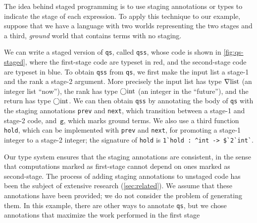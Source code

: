 \begin{abstrsyn}
The idea behind staged programming is to use staging annotations or
types to indicate the stage of each expression.  To apply this
technique to our example, suppose that we have a language with two
worlds representing the two stages and a third, {\em ground} world
that contains terms with no staging.

We can write a staged version of \texttt{qs}, called \texttt{qss},
whose code is shown in \ref{fig:qs-staged}, where the first-stage code
are typeset in red, and the second-stage code are typeset in blue.  To
obtain \texttt{qss} from \texttt{qs}, we first make the input list a
stage-1 and the rank a stage-2 argument.
%
More precisely the input list has type $\nabla\mathrm{list}$ (an
integer list ``now''), the rank has type $\bigcirc{\rm int}$ (an integer in
the ``future''), and the return has type $\bigcirc{\rm int}$.
%
We can then obtain \texttt{qss} by annotating the body of \texttt{qs}
with the staging annotations \texttt{prev} and \texttt{next}, which
transition between a stage-1 and stage-2 code, and~$\texttt{g}$, which
marks ground terms.  
%
We also use a third function
\texttt{hold}, which can be implemented with \texttt{prev} and
\texttt{next}, for promoting a stage-1 integer to a stage-2 integer;
the signature of \texttt{hold} is
% 
\lstinline{1`hold : ^int -> $`2`int`}.
%


Our type system ensures that the staging annotations are consistent,
in the sense that computations marked as first-stage cannot depend on
ones marked as second-stage.
%
The process of adding staging annotations to unstaged code has been
the subject of extensive research (\ref{sec:related}). We assume that
these annotations have been provided; we do not consider the problem
of generating them. In this example, there are other ways to annotate
\texttt{qs}, but we chose annotations that maximize the work performed
in the first stage








\end{abstrsyn}
